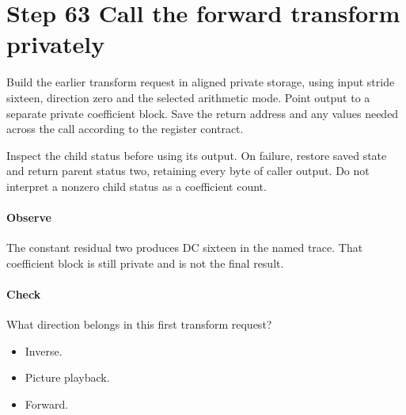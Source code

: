\section{Step 63 Call the forward transform privately}\label{h263-block-s03}
Build the earlier transform request in aligned private storage, using input
stride sixteen, direction zero and the selected arithmetic mode. Point output
to a separate private coefficient block. Save the return address and any values
needed across the call according to the register contract.

Inspect the child status before using its output. On failure, restore saved
state and return parent status two, retaining every byte of caller output.
Do not interpret a nonzero child status as a coefficient count.

\paragraph{Observe} The constant residual two produces DC sixteen in the named
trace. That coefficient block is still private and is not the final result.
\paragraph{Check} What direction belongs in this first transform request?
\begin{itemize}
  \item[A.] Inverse.
  \item[B.] Picture playback.
  \item[C.] Forward.
\end{itemize}
